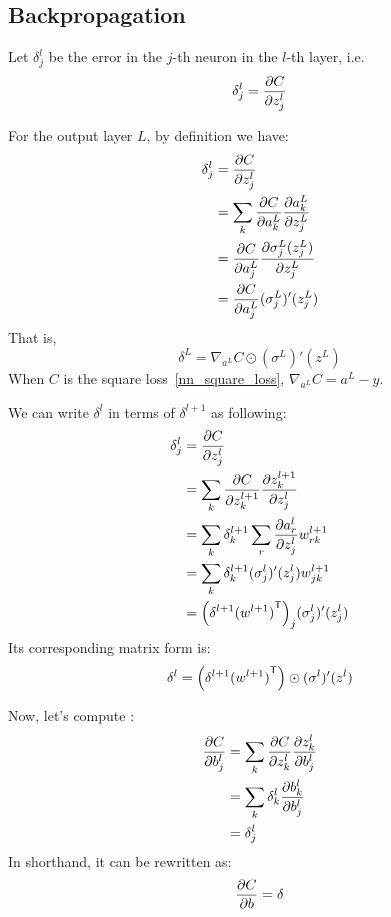 \subsection{Backpropagation}
Let $\delta^l_j$ be the error in the $j$-th neuron in the $l$-th layer, i.e.
\begin{equation}
    \delta^l_j = \frac{\partial {C}}{\partial {z^l_j}}
\end{equation}

For the output layer $L$, by definition we have:
\begin{align*}
    \delta^l_j &= \frac{\partial {C}}{\partial {z^l_j}}\\
               &= \sum_k \frac{\partial {C}}{\partial {a^L_k}} \frac{\partial {a^L_k}}{\partial {z^L_j}}\\
               &= \frac{\partial {C}}{\partial {a^L_j}} \frac{\partial {\sigma^L_j(z^L_j)}}{\partial {z^L_j}}\\
               &= \frac{\partial {C}}{\partial {a^L_j}} (\sigma^L_j)'(z^L_j)
\end{align*}
That is,
\begin{equation}
    \delta^L = \nabla_{a^L}C \odot (\sigma^L)'(z^L)
\end{equation}
When $C$ is the square loss~\eqref{nn_square_loss}, $\nabla_{a^L}C = a^L - y$.

We can write $\delta^l$ in terms of $\delta^{l+1}$ as following:
\begin{align*}
    \delta^l_j &= \frac{\partial {C}}{\partial {z^l_j}}\\
               &= \sum_k \frac{\partial {C}}{\partial {z^{l+1}_k}} \frac{\partial {z^{l+1}_k}}{\partial {z^l_j}}\\
               &= \sum_k \delta^{l+1}_k \sum_r \frac{\partial {a^l_r}}{\partial {z^l_j}} w^{l+1}_{rk}\\
               &= \sum_k \delta^{l+1}_k (\sigma^l_j)'(z^l_j) w^{l+1}_{jk}\\
               &= {\left(\delta^{l+1} {(w^{l+1})}^\mathsf{T}\right)}_{j} (\sigma^l_j)'(z^l_j)
\end{align*}
Its corresponding matrix form is:
\begin{equation}
    \delta^l = \left(\delta^{l+1} {(w^{l+1})}^\mathsf{T}\right) \odot (\sigma^l)'(z^l)
\end{equation}

Now, let's compute :
\begin{align*}
    \frac{\partial {C}}{\partial {b^l_j}} &= \sum_k \frac{\partial {C}}{\partial {z^l_k}} \frac{\partial {z^l_k}}{\partial {b^l_j}}\\
                     &= \sum_k \delta^l_k \frac{\partial {b^l_k}}{\partial {b^l_j}}\\
                     &= \delta^l_j
\end{align*}
In shorthand, it can be rewritten as:
\begin{equation}
    \frac{\partial {C}}{\partial {b}} = \delta
\end{equation}

